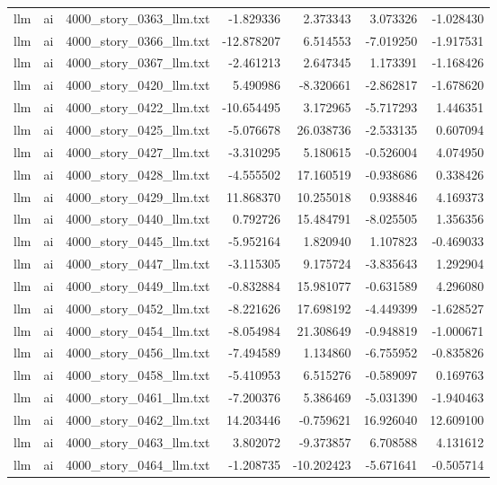\begin{longtable}{lllrrrr}
llm & ai & 4000\_story\_0363\_llm.txt & -1.829336 & 2.373343 & 3.073326 & -1.028430 \\
llm & ai & 4000\_story\_0366\_llm.txt & -12.878207 & 6.514553 & -7.019250 & -1.917531 \\
llm & ai & 4000\_story\_0367\_llm.txt & -2.461213 & 2.647345 & 1.173391 & -1.168426 \\
llm & ai & 4000\_story\_0420\_llm.txt & 5.490986 & -8.320661 & -2.862817 & -1.678620 \\
llm & ai & 4000\_story\_0422\_llm.txt & -10.654495 & 3.172965 & -5.717293 & 1.446351 \\
llm & ai & 4000\_story\_0425\_llm.txt & -5.076678 & 26.038736 & -2.533135 & 0.607094 \\
llm & ai & 4000\_story\_0427\_llm.txt & -3.310295 & 5.180615 & -0.526004 & 4.074950 \\
llm & ai & 4000\_story\_0428\_llm.txt & -4.555502 & 17.160519 & -0.938686 & 0.338426 \\
llm & ai & 4000\_story\_0429\_llm.txt & 11.868370 & 10.255018 & 0.938846 & 4.169373 \\
llm & ai & 4000\_story\_0440\_llm.txt & 0.792726 & 15.484791 & -8.025505 & 1.356356 \\
llm & ai & 4000\_story\_0445\_llm.txt & -5.952164 & 1.820940 & 1.107823 & -0.469033 \\
llm & ai & 4000\_story\_0447\_llm.txt & -3.115305 & 9.175724 & -3.835643 & 1.292904 \\
llm & ai & 4000\_story\_0449\_llm.txt & -0.832884 & 15.981077 & -0.631589 & 4.296080 \\
llm & ai & 4000\_story\_0452\_llm.txt & -8.221626 & 17.698192 & -4.449399 & -1.628527 \\
llm & ai & 4000\_story\_0454\_llm.txt & -8.054984 & 21.308649 & -0.948819 & -1.000671 \\
llm & ai & 4000\_story\_0456\_llm.txt & -7.494589 & 1.134860 & -6.755952 & -0.835826 \\
llm & ai & 4000\_story\_0458\_llm.txt & -5.410953 & 6.515276 & -0.589097 & 0.169763 \\
llm & ai & 4000\_story\_0461\_llm.txt & -7.200376 & 5.386469 & -5.031390 & -1.940463 \\
llm & ai & 4000\_story\_0462\_llm.txt & 14.203446 & -0.759621 & 16.926040 & 12.609100 \\
llm & ai & 4000\_story\_0463\_llm.txt & 3.802072 & -9.373857 & 6.708588 & 4.131612 \\
llm & ai & 4000\_story\_0464\_llm.txt & -1.208735 & -10.202423 & -5.671641 & -0.505714 \\

\end{longtable}
